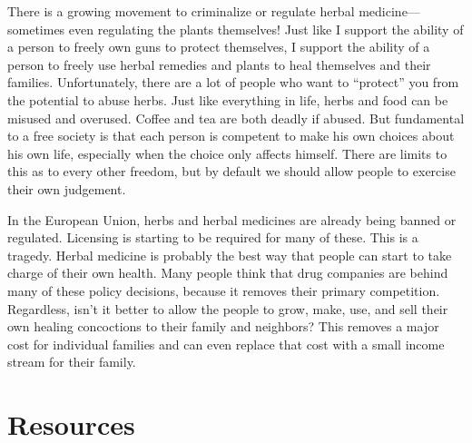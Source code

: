 \begin{policynote}
There is a growing movement to criminalize or regulate herbal
medicine---sometimes even regulating the plants themselves!  Just like I
support the ability of a person to freely own guns to protect
themselves, I support the ability of a person to freely use herbal
remedies and plants to heal themselves and their families.
Unfortunately, there are a lot of people who want to
``protect'' you from the potential to abuse
herbs. Just like everything in life, herbs and food can be misused and
overused. Coffee and tea are both deadly if abused. But fundamental to
a free society is that each person is competent to make
his own choices about his own life,
especially when the choice only affects himself.  There are limits to
this as to every other freedom, but by default we should allow people
to exercise their own judgement.

In the European Union, herbs and herbal medicines are already being
banned or regulated. Licensing is starting to be required for many of
these. This is a tragedy. Herbal medicine is probably the best way that
people can start to take charge of their own health. Many people think
that drug companies are behind many of these policy decisions, because
it removes their primary competition.
Regardless, isn’t it better to allow the people to
grow, make, use, and sell their own healing concoctions to their family
and neighbors?  This removes a major cost for individual
families and can even replace that cost with a small
income stream for their family. 
\end{policynote}

\section{Resources}

